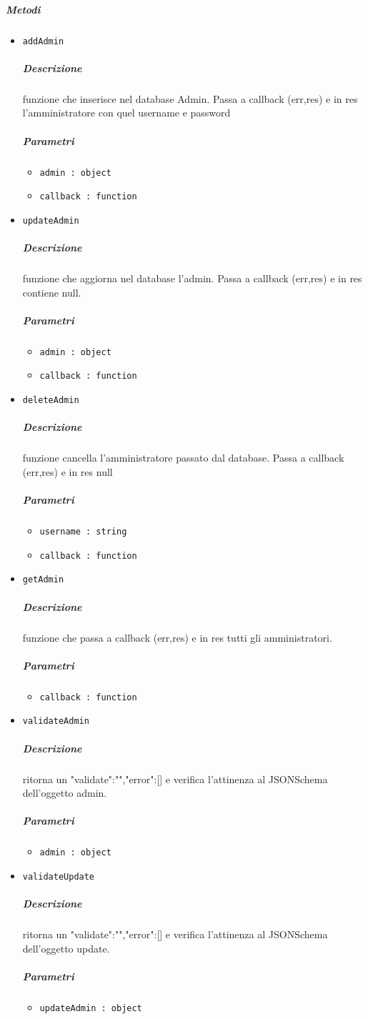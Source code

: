 \documentclass[../ManualeSviluppatore_v2.0.0.tex]{subfiles}
\begin{document}
\subparagraph{Metodi}\begin{itemize}
\item \texttt{addAdmin}
\subparagraph{Descrizione} funzione che inserisce nel database Admin. Passa a callback (err,res) e in res l'amministratore con quel username e password
\subparagraph{Parametri} \begin{itemize}
\item \texttt{admin : object}
\item \texttt{callback : function}
\end{itemize}
\item \texttt{updateAdmin}
\subparagraph{Descrizione} funzione che aggiorna nel database l'admin. Passa a callback (err,res) e in res contiene null.
\subparagraph{Parametri} \begin{itemize}
\item \texttt{admin : object}
\item \texttt{callback : function}
\end{itemize}
\item \texttt{deleteAdmin}
\subparagraph{Descrizione} funzione cancella l'amministratore passato dal database. Passa a callback (err,res) e in res null
\subparagraph{Parametri} \begin{itemize}
\item \texttt{username : string}
\item \texttt{callback : function}
\end{itemize}
\item \texttt{getAdmin}
\subparagraph{Descrizione} funzione che passa a callback (err,res) e in res tutti gli amministratori.
\subparagraph{Parametri} \begin{itemize}
\item \texttt{callback : function}
\end{itemize}
\item \texttt{validateAdmin}
\subparagraph{Descrizione} ritorna un {"validate":"","error":[]} e verifica l'attinenza al JSONSchema dell'oggetto admin.
\subparagraph{Parametri} \begin{itemize}
\item \texttt{admin : object}
\end{itemize}
\item \texttt{validateUpdate}
\subparagraph{Descrizione} ritorna un {"validate":"","error":[]} e verifica l'attinenza al JSONSchema dell'oggetto update.
\subparagraph{Parametri} \begin{itemize}
\item \texttt{updateAdmin : object}
\end{itemize}
\end{itemize}
\end{document}
